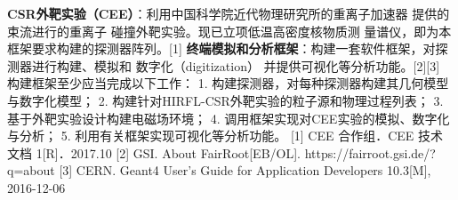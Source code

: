 \assignReq
{\textbf{CSR外靶实验（CEE）}：利用中国科学院近代物理研究所的重离子加速器}
{提供的束流进行的重离子 碰撞外靶实验。现已立项低温高密度核物质测}
{量谱仪，即为本框架要求构建的探测器阵列。[1]}
{\textbf{终端模拟和分析框架}：构建一套软件框架，对探测器进行构建、模拟和}
{数字化（digitization） 并提供可视化等分析功能。[2][3]}
\assignWork
{构建框架至少应当完成以下工作：}
{1. 构建探测器，对每种探测器构建其几何模型与数字化模型；}
{2. 构建针对HIRFL-CSR外靶实验的粒子源和物理过程列表；}
{3. 基于外靶实验设计构建电磁场环境；}
{4. 调用框架实现对CEE实验的模拟、数字化与分析；}
{5. 利用有关框架实现可视化等分析功能。}
\assignRef
{[1] CEE 合作组．CEE 技术文档 1[R]．2017.10}
{[2] GSI. About FairRoot[EB/OL]. https://fairroot.gsi.de/?q=about}
{[3] CERN. Geant4 User's Guide for Application Developers 10.3[M], 2016-12-06}
{}
{}
{}
{}
{}
